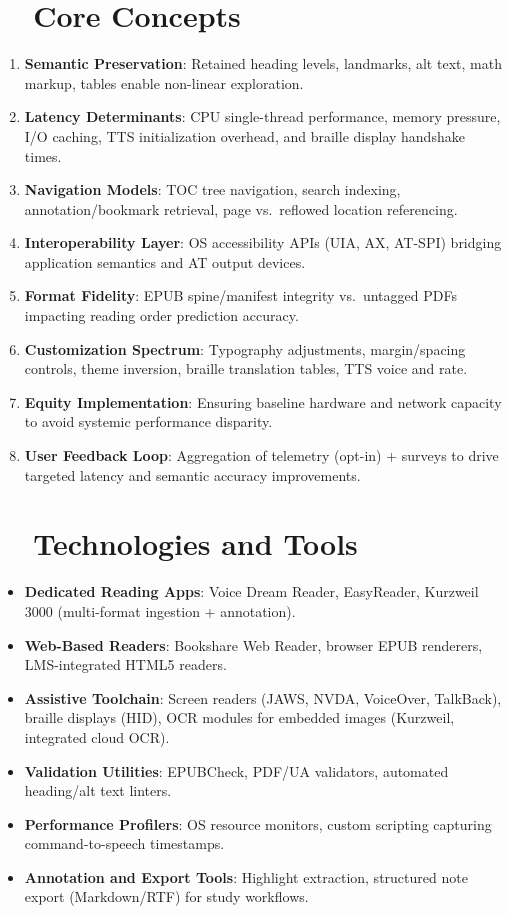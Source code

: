 \section{~~Core Concepts}
\label{sec:sr27-core-concepts}
\begin{enumerate}
	\item \textbf{Semantic Preservation}: Retained heading levels, landmarks, alt text, math markup, tables enable non-linear exploration.
	\item \textbf{Latency Determinants}: CPU single-thread performance, memory pressure, I/O caching, TTS initialization overhead, and braille display handshake times\supercite{Fowler2011ScreenReaderLatency, Sears1993TheEffectOfResponseTime}.
	\item \textbf{Navigation Models}: TOC tree navigation, search indexing, annotation/bookmark retrieval, page vs.\ reflowed location referencing.
	\item \textbf{Interoperability Layer}: OS accessibility APIs (UIA, AX, AT-SPI) bridging application semantics and AT output devices.
	\item \textbf{Format Fidelity}: EPUB spine/manifest integrity vs.\ untagged PDFs impacting reading order prediction accuracy.
	\item \textbf{Customization Spectrum}: Typography adjustments, margin/spacing controls, theme inversion, braille translation tables, TTS voice and rate.
	\item \textbf{Equity Implementation}: Ensuring baseline hardware and network capacity to avoid systemic performance disparity.
	\item \textbf{User Feedback Loop}: Aggregation of telemetry (opt-in) + surveys to drive targeted latency and semantic accuracy improvements.
\end{enumerate}

\section{~~Technologies and Tools}
\label{sec:sr27-technologies}
\begin{itemize}
	\item \textbf{Dedicated Reading Apps}: Voice Dream Reader, EasyReader, Kurzweil 3000 (multi-format ingestion + annotation).
	\item \textbf{Web-Based Readers}: Bookshare Web Reader, browser EPUB renderers, LMS-integrated HTML5 readers.
	\item \textbf{Assistive Toolchain}: Screen readers (JAWS, NVDA, VoiceOver, TalkBack), braille displays (HID), OCR modules for embedded images (Kurzweil, integrated cloud OCR).
	\item \textbf{Validation Utilities}: EPUBCheck, PDF/UA validators, automated heading/alt text linters.
	\item \textbf{Performance Profilers}: OS resource monitors, custom scripting capturing command-to-speech timestamps.
	\item \textbf{Annotation and Export Tools}: Highlight extraction, structured note export (Markdown/RTF) for study workflows.
\end{itemize}

